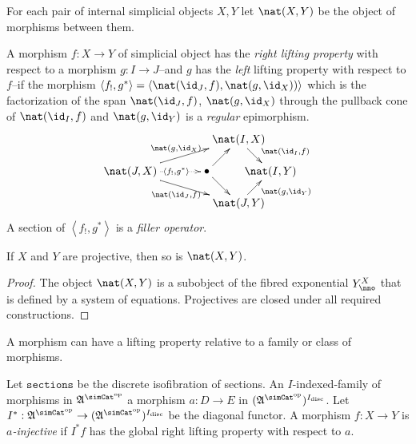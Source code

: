 \documentclass{tac}
\newcommand\hide[1]{}
\newcommand\ri{^*}
\newcommand\dual{^{\mathrm{op}}}
\newcommand\disc{_{\mathrm{disc}}}
\newcommand\s{^{\simCat\dual}}
\newcommand\bang{!}
\newcommand\of{:}
\newcommand\tuplet[1]{\left\langle #1 \right\rangle}
\newcommand\code\mathtt
\newcommand\ambient{\mathfrak A}
\begin{document}
\begin{definition} For each pair of internal simplicial objects $X,Y$ let $\nat(X,Y)$ be the object of morphisms between them.

A morphism $f\of X\to Y$ of simplicial object has the \emph{right lifting property} with respect to a morphism $g\of I\to J$--and $g$ has the \emph{left} lifting property with respect to $f$--if the morphism $\tuplet{f_!,g\ri} = \tuplet{\nat(\id_J,f),\nat(g,\id_X))}$ 
which is the factorization of the span $\nat(\id_J,f)$, $\nat(g,\id_X)$ through the pullback cone of $\nat(\id_I,f)$ and $\nat(g,\id_Y)$
is a \emph{regular} epimorphism.
\[\xy
(34,20)*+{\nat(I,X)}="top",(0,10)*+{\nat(J,X)}="left",(24,10)*+{\bullet}="middle",(44,10)*+{\nat(I,Y)}="right",(34,0)*+{\nat(J,Y)}="bottom"
\ar^{\nat(g,\id_X)} "left";"top" \ar@{.>}|(.6){\tuplet{f_!,g\ri}} "left";"middle" \ar_{\nat(\id_J,f)} "left";"bottom" \ar "middle";"bottom"
\ar "middle";"top" \ar^(.6){\nat(\id_I,f)} "top";"right" \ar_(.6){\nat(g,\id_Y)} "bottom";"right"
\endxy\]
A section of $\tuplet{f_\bang,g\ri}$ is a \emph{filler operator}.\label{lifting}
\end{definition}

\hide{explain why this is important}
\begin{lemma} If $X$ and $Y$ are projective, then so is $\nat(X,Y)$. \end{lemma}

\begin{proof} The object $\nat(X,Y)$ is a subobject of the fibred exponential $Y^X_\nno$ that is defined by a system of equations. Projectives are closed under all required constructions.
\end{proof}

A morphism can have a lifting property relative to a family or class of morphisms.


\hide{
n=New idea: everything follows form the projectivity of added faces.

We don't need the object of realizers anymore either.
}

\hide{
Explain $I\ri\of\ambient\s\to (\ambient\s)^{I\disc}$ somewhere. It should be an internal simplicial object of the slice category. i.e. $(\ambient/I)\s$. 
}
\begin{definition}[Injective] Let $\code{sections}$ be the discrete isofibration of sections. %
An $I$-indexed-family of morphisms in $\ambient\s$ a morphism $a\of D\to E$ in $(\ambient\s)^{I\disc}$. Let $I\ri\of\ambient\s\to (\ambient\s)^{I\disc}$ be the diagonal functor. A morphism $f\of X\to Y$ is \emph{$a$-injective} if $I\ri f$ has the global right lifting property with respect to $a$.
\end{definition}
\end{document}
